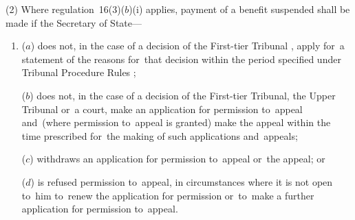 \documentclass[12pt,a4paper]{article}
\begin{document}
%

(2) Where regulation~16(3)($b$)(i)  applies, payment of a benefit suspended shall be made if the Secretary of State—
\begin{enumerate}\item[]
($a$) does not, in the case of a decision of 
the First-tier Tribunal%
, apply for~a statement of the reasons for~that decision within the period 
specified under Tribunal Procedure Rules%
;

($b$) does not, in the case of a decision of 
the First-tier Tribunal, the Upper Tribunal  %
or~a court, make an application for 
permission  %
to~appeal and~(where 
permission  %
to~appeal is granted) make the appeal within the time prescribed for~the making of such applications and~appeals;

($c$) withdraws an application for 
permission  %
to~appeal or~the appeal; or

($d$) is refused 
permission  %
to~appeal, in circumstances where it is not open to~him to~renew the application for 
permission  %
or~to~make a further application for 
permission  %
to~appeal.
\end{enumerate}
\end{document}
